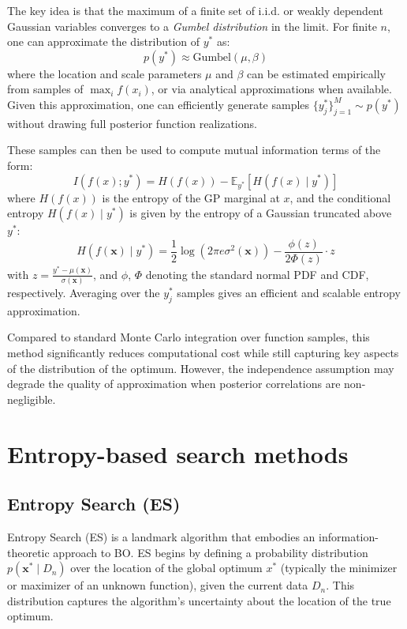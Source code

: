 \documentclass{ut-thesis}
\begin{document}
The key idea is that the maximum of a finite set of i.i.d. or weakly dependent Gaussian variables converges to a \textit{Gumbel distribution} in the limit. For finite \( n \), one can approximate the distribution of \( y^* \) as:
\begin{equation}
    p(y^*) \approx \text{Gumbel}(\mu, \beta)
\end{equation}
where the location and scale parameters \( \mu \) and \( \beta \) can be estimated empirically from samples of \( \max_i f(x_i) \), or via analytical approximations when available. Given this approximation, one can efficiently generate samples \( \{ y_j^* \}_{j=1}^M \sim p(y^*) \) without drawing full posterior function realizations.

These samples can then be used to compute mutual information terms of the form:
\begin{equation}
I(f(x); y^*) = H(f(x)) - \mathbb{E}_{y^*}[H(f(x) \mid y^*)]    
\end{equation}
where \( H(f(x)) \) is the entropy of the GP marginal at \( x \), and the conditional entropy \( H(f(x) \mid y^*) \) is given by the entropy of a Gaussian truncated above \( y^* \):
\begin{equation}
    H(f(\mathbf{x}) \mid y^*) = \frac{1}{2} \log(2\pi e \sigma^2(\mathbf{x})) - \frac{\phi(z)}{2\Phi(z)} \cdot z
\end{equation}
with \( z = \frac{y^* - \mu(\mathbf{x})}{\sigma(\mathbf{x})} \), and \( \phi \), \( \Phi \) denoting the standard normal PDF and CDF, respectively. Averaging over the \( y^*_j \) samples gives an efficient and scalable entropy approximation.

Compared to standard Monte Carlo integration over function samples, this method significantly reduces computational cost while still capturing key aspects of the distribution of the optimum. However, the independence assumption may degrade the quality of approximation when posterior correlations are non-negligible.


\section{Entropy-based search methods}

\subsection{Entropy Search (ES)}

Entropy Search (ES) is a landmark algorithm that embodies an information-theoretic approach to BO\cite{hennig2012entropy}.  ES begins by defining a probability distribution \( p(\mathbf{x}^* \mid D_n) \) over the location of the global optimum \( x^* \) (typically the minimizer or maximizer of an unknown function), given the current data \( D_n \). This distribution captures the algorithm’s uncertainty about the location of the true optimum.
\end{document}
